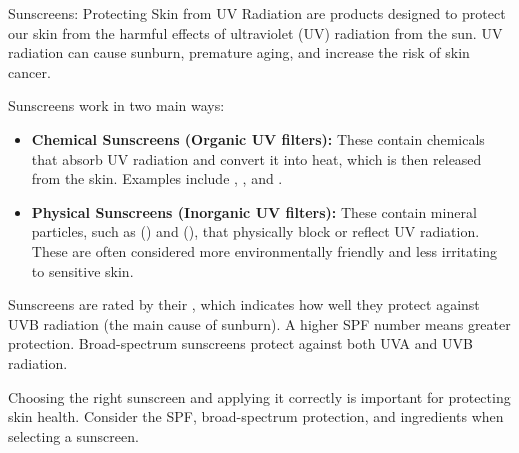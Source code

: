 \begin{keyconcept}{Sunscreens: Protecting Skin from UV Radiation}
 are products designed to protect our skin from the harmful effects of ultraviolet (UV) radiation from the sun.  UV radiation can cause sunburn, premature aging, and increase the risk of skin cancer.

Sunscreens work in two main ways:

\begin{itemize}
    \item \textbf{Chemical Sunscreens (Organic UV filters):}  These contain chemicals that absorb UV radiation and convert it into heat, which is then released from the skin. Examples include , , and .
    \item \textbf{Physical Sunscreens (Inorganic UV filters):} These contain mineral particles, such as  () and  (), that physically block or reflect UV radiation.  These are often considered more environmentally friendly and less irritating to sensitive skin.
\end{itemize}

Sunscreens are rated by their , which indicates how well they protect against UVB radiation (the main cause of sunburn). A higher SPF number means greater protection.  Broad-spectrum sunscreens protect against both UVA and UVB radiation.

Choosing the right sunscreen and applying it correctly is important for protecting skin health.  Consider the SPF, broad-spectrum protection, and ingredients when selecting a sunscreen.
\end{keyconcept}

